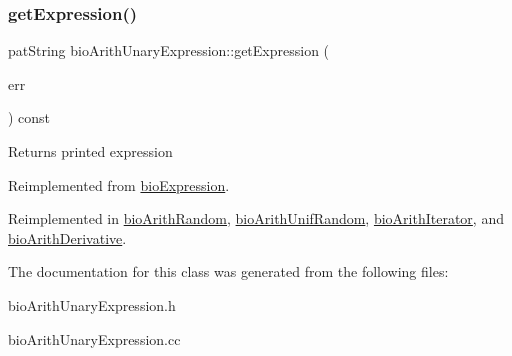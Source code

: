 \subsubsection{\texorpdfstring{get\+Expression()}{getExpression()}}
{\footnotesize\ttfamily pat\+String bio\+Arith\+Unary\+Expression\+::get\+Expression (\begin{DoxyParamCaption}\item[{pat\+Error $\ast$\&}]{err }\end{DoxyParamCaption}) const\hspace{0.3cm}{\ttfamily [virtual]}}

\begin{DoxyReturn}{Returns}
printed expression 
\end{DoxyReturn}


Reimplemented from \hyperlink{classbio_expression_a66a83eb0caac18dd5e568ffde5a8b5d4}{bio\+Expression}.



Reimplemented in \hyperlink{classbio_arith_random_a54b48a4876469d44f324f73758ea1b6c}{bio\+Arith\+Random}, \hyperlink{classbio_arith_unif_random_a4c81af6983404929d1e06367f69a2256}{bio\+Arith\+Unif\+Random}, \hyperlink{classbio_arith_iterator_aceb6ee1a4c024349178de5edf4624710}{bio\+Arith\+Iterator}, and \hyperlink{classbio_arith_derivative_a5cdf6c4903ec8123b30c0d2ce059718d}{bio\+Arith\+Derivative}.



The documentation for this class was generated from the following files\+:\begin{DoxyCompactItemize}
\item 
bio\+Arith\+Unary\+Expression.\+h\item 
bio\+Arith\+Unary\+Expression.\+cc\end{DoxyCompactItemize}
